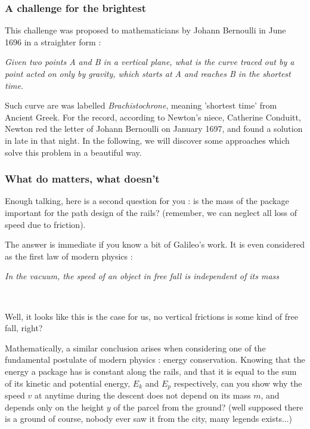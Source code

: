 \documentclass{article}
\begin{document}
\subsubsection*{A challenge for the brightest}

This challenge was proposed to mathematicians by Johann Bernoulli in June 1696 in a straighter form :
\begin{center}
  \textit{Given two points A and B in a vertical plane, what is the curve traced out by a point acted on only by gravity, which starts at A and reaches B in the shortest time.}
\end{center}
Such curve are was labelled \textit{Brachistochrone}, meaning 'shortest time' from Ancient Greek. For the record, according to Newton's niece, Catherine Conduitt, Newton red the letter of Johann Bernoulli on January 1697, and found a solution in late in that night. In the following, we will discover some approaches which solve this problem in a beautiful way.


\subsubsection*{What do matters, what doesn't}

Enough talking, here is a second question for you : is the mass of the package important for the path design of the rails? (remember, we can neglect all loss of speed due to friction).

The answer is immediate if you know a bit of Galileo's work. It is even considered as the first law of modern physics :\\

\begin{tcolorbox}
\begin{center}
  \textit{In the vacuum, the speed of an object in free fall is independent of its mass}
\end{center}
\end{tcolorbox}
~

Well, it looks like this is the case for us, no vertical frictions is some kind of free fall, right?

Mathematically, a similar conclusion arises when considering one of the fundamental postulate of modern physics : energy conservation. Knowing that the energy a package has is constant along the rails, and that it is equal to the sum of its kinetic and potential energy, $E_k$ and $E_p$ respectively, can you show why the speed $v$ at anytime during the descent does not depend on its mass $m$, and depends only on the height $y$ of the parcel from the ground? (well supposed there is a ground of course, nobody ever saw it from the city, many legends exists...)
\end{document}
